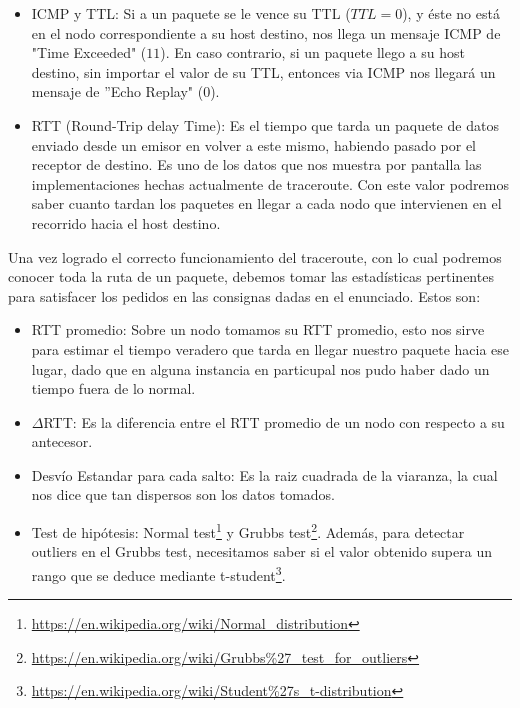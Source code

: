 \begin{itemize}
\item ICMP y TTL: Si a un paquete se le vence su TTL ($TTL = 0$), y \'este no est\'a en el nodo correspondiente a su host destino, nos llega un mensaje ICMP de "Time Exceeded" ($11$). En caso contrario, si un paquete llego a su host destino, sin importar el valor de su TTL, entonces via ICMP nos llegar\'a un mensaje de ''Echo Replay" ($0$).

\item RTT (Round-Trip delay Time): Es el tiempo que tarda un paquete de datos enviado desde un emisor en volver a este mismo, habiendo pasado por el receptor de destino. Es uno de los datos que nos muestra por pantalla las implementaciones hechas actualmente de traceroute. Con este valor podremos saber cuanto tardan los paquetes en llegar a cada nodo que intervienen en el recorrido hacia el host destino.

\end{itemize}

Una vez logrado el correcto funcionamiento del traceroute, con lo cual podremos conocer toda la ruta de un paquete, debemos tomar las estadísticas pertinentes para satisfacer los pedidos en las consignas dadas en el enunciado. Estos son:

\begin{itemize}

\item RTT promedio: Sobre un nodo tomamos su RTT promedio, esto nos sirve para estimar el tiempo veradero que tarda en llegar nuestro paquete hacia ese lugar, dado que en alguna instancia en particupal nos pudo haber dado un tiempo fuera de lo normal.

\item $\Delta$RTT: Es la diferencia entre el RTT promedio de un nodo con respecto a su antecesor.

\item Desv\'io Estandar para cada salto: Es la raiz cuadrada de la viaranza, la cual nos dice que tan dispersos son los datos tomados.

\item Test de hip\'otesis: Normal test\footnote{\url{https://en.wikipedia.org/wiki/Normal_distribution}} y Grubbs test\footnote{\url{https://en.wikipedia.org/wiki/Grubbs\%27_test_for_outliers}}. Adem\'as, para detectar outliers en el Grubbs test, necesitamos saber si el valor obtenido supera un rango que se deduce mediante t-student\footnote{\url{https://en.wikipedia.org/wiki/Student\%27s_t-distribution}}.

\end{itemize}

